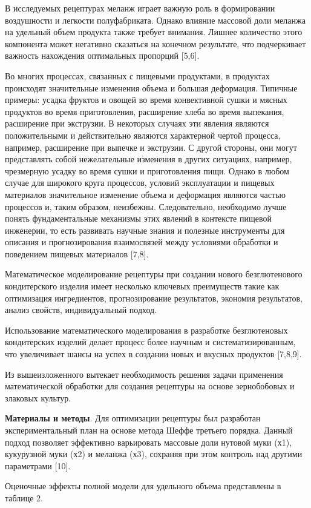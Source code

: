 \begin{multicols}{2}
В исследуемых рецептурах меланж играет важную роль в формировании
воздушности и легкости полуфабриката. Однако влияние массовой доли
меланжа на удельный объем продукта также требует внимания. Лишнее
количество этого компонента может негативно сказаться на конечном
результате, что подчеркивает важность нахождения оптимальных пропорций
{[}5,6{]}.

Во многих процессах, связанных с пищевыми продуктами, в продуктах
происходят значительные изменения объема и большая деформация. Типичные
примеры: усадка фруктов и овощей во время конвективной сушки и мясных
продуктов во время приготовления, расширение хлеба во время выпекания,
расширение при экструзии. В некоторых случаях эти явления являются
положительными и действительно являются характерной чертой процесса,
например, расширение при выпечке и экструзии. С другой стороны, они
могут представлять собой нежелательные изменения в других ситуациях,
например, чрезмерную усадку во время сушки и приготовления пищи. Однако
в любом случае для широкого круга процессов, условий эксплуатации и
пищевых материалов значительное изменение объема и деформация являются
частью процессов и, таким образом, неизбежны. Следовательно, необходимо
лучше понять фундаментальные механизмы этих явлений в контексте пищевой
инженерии, то есть развивать научные знания и полезные инструменты для
описания и прогнозирования взаимосвязей между условиями обработки и
поведением пищевых материалов {[}7,8{]}.

Математическое моделирование рецептуры при создании нового
безглютенового кондитерского изделия имеет несколько ключевых
преимуществ такие как оптимизация ингредиентов, прогнозирование
результатов, экономия результатов, анализ свойств, индивидуальный
подход.

Использование математического моделирования в разработке безглютеновых
кондитерских изделий делает процесс более научным и систематизированным,
что увеличивает шансы на успех в создании новых и вкусных продуктов
{[}7,8,9{]}.

Из вышеизложенного вытекает необходимость решения задачи применения
математической обработки для создания рецептуры на основе зернобобовых и
злаковых культур.

{\bfseries Материалы и методы}. Для оптимизации рецептуры был разработан
экспериментальный план на основе метода Шеффе третьего порядка. Данный
подход позволяет эффективно варьировать массовые доли нутовой муки (х1),
кукурузной муки (х2) и меланжа (х3), сохраняя при этом контроль над
другими параметрами {[}10{]}.

Оценочные эффекты полной модели для удельного объема представлены в
таблице 2. 
\end{multicols}

